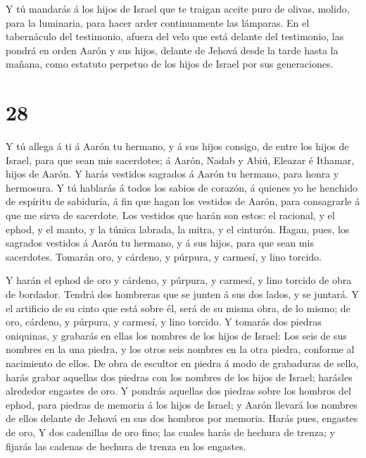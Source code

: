  Y tú mandarás á los hijos de Israel que te traigan aceite
puro de olivas, molido, para la luminaria, para hacer arder
continuamente las lámparas.  En el tabernáculo del
testimonio, afuera del velo que está delante del testimonio, las pondrá
en orden Aarón y sus hijos, delante de Jehová desde la tarde hasta la
mañana, como estatuto perpetuo de los hijos de Israel por sus
generaciones.

\hypertarget{section-27}{%
\section{28}\label{section-27}}

 Y tú allega á ti á Aarón tu hermano, y á sus hijos consigo,
de entre los hijos de Israel, para que sean mis sacerdotes; á Aarón,
Nadab y Abiú, Eleazar é Ithamar, hijos de Aarón.  Y harás
vestidos sagrados á Aarón tu hermano, para honra y hermosura.
 Y tú hablarás á todos los sabios de corazón, á quienes yo
he henchido de espíritu de sabiduría, á fin que hagan los vestidos de
Aarón, para consagrarle á que me sirva de sacerdote.  Los
vestidos que harán son estos: el racional, y el ephod, y el manto, y la
túnica labrada, la mitra, y el cinturón. Hagan, pues, los sagrados
vestidos á Aarón tu hermano, y á sus hijos, para que sean mis
sacerdotes.  Tomarán oro, y cárdeno, y púrpura, y carmesí, y
lino torcido.

 Y harán el ephod de oro y cárdeno, y púrpura, y carmesí, y
lino torcido de obra de bordador.  Tendrá dos hombreras que
se junten á sus dos lados, y se juntará.  Y el artificio de
su cinto que está sobre él, será de su misma obra, de lo mismo; de oro,
cárdeno, y púrpura, y carmesí, y lino torcido.  Y tomarás
dos piedras oniquinas, y grabarás en ellas los nombres de los hijos de
Israel:  Los seis de sus nombres en la una piedra, y los
otros seis nombres en la otra piedra, conforme al nacimiento de ellos.
 De obra de escultor en piedra á modo de grabaduras de
sello, harás grabar aquellas dos piedras con los nombres de los hijos de
Israel; harásles alrededor engastes de oro.  Y pondrás
aquellas dos piedras sobre los hombros del ephod, para piedras de
memoria á los hijos de Israel; y Aarón llevará los nombres de ellos
delante de Jehová en sus dos hombros por memoria.  Harás
pues, engastes de oro,  Y dos cadenillas de oro fino; las
cuales harás de hechura de trenza; y fijarás las cadenas de hechura de
trenza en los engastes.

